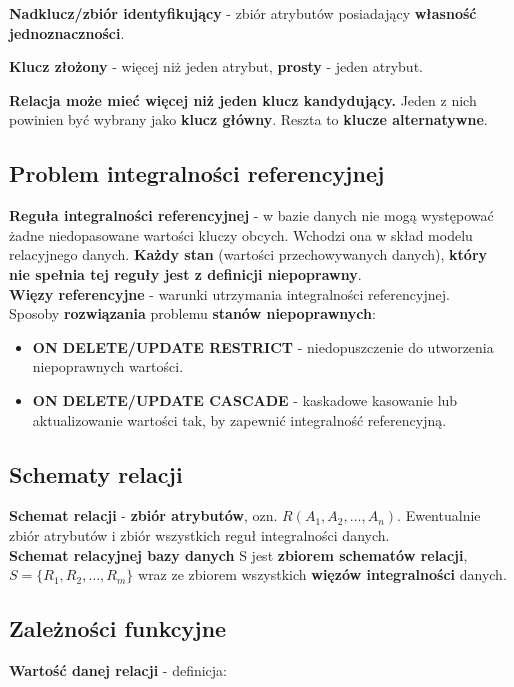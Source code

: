 \documentclass[a4paper]{article}
\begin{document}
\textbf{Nadklucz/zbiór identyfikujący} - zbiór atrybutów posiadający \textbf{własność jednoznaczności}.

\textbf{Klucz złożony} - więcej niż jeden atrybut, \textbf{prosty} - jeden atrybut.

\textbf{Relacja może mieć więcej niż jeden klucz kandydujący. } Jeden z nich powinien być wybrany jako \textbf{klucz główny}. Reszta to \textbf{klucze alternatywne}.\\

\subsection{Problem integralności referencyjnej}
\textbf{Reguła integralności referencyjnej} - w bazie danych nie mogą występować żadne niedopasowane wartości kluczy obcych. Wchodzi ona w skład modelu relacyjnego danych. \textbf{Każdy stan} (wartości przechowywanych danych), \textbf{który nie spełnia tej reguły jest z definicji niepoprawny}.\\
\textbf{Więzy referencyjne} - warunki utrzymania integralności referencyjnej.\\

Sposoby \textbf{rozwiązania} problemu \textbf{stanów niepoprawnych}:
\begin{itemize}
    \item \textbf{ON DELETE/UPDATE RESTRICT} - niedopuszczenie do utworzenia niepoprawnych wartości.
    \item \textbf{ON DELETE/UPDATE CASCADE} - kaskadowe kasowanie lub aktualizowanie wartości tak, by zapewnić integralność referencyjną.
\end{itemize}

\subsection{Schematy relacji}
\textbf{Schemat relacji} - \textbf{zbiór atrybutów}, ozn. $R(A_1,A_2, \dots ,A_n)$. Ewentualnie zbiór atrybutów i zbiór wszystkich reguł integralności danych.\\
\textbf{Schemat relacyjnej bazy danych} S jest \textbf{zbiorem schematów relacji}, $S=\{ R_1, R_2, \dots , R_m \}$ wraz ze zbiorem wszystkich \textbf{więzów integralności} danych.

\subsection{Zależności funkcyjne}
\textbf{Wartość danej relacji} - definicja:
\end{document}
